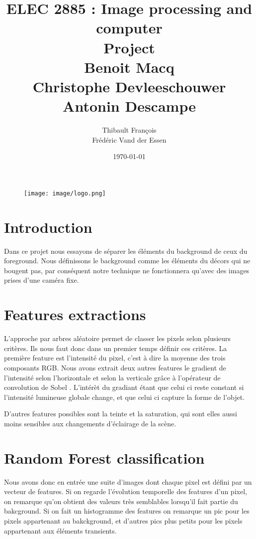 \documentclass[8pt,a4paper]{report}
\title{ELEC 2885 : Image processing and computer  \\ Project \\
Benoit Macq \\ Christophe Devleeschouwer \\ Antonin Descampe}
\author{Thibault François \\ Frédéric Vand der Essen}
\date{\today}
\begin{document}
	\begin{titlepage}		
		\begin{figure}[tbp]
			\begin{center}
				\texttt{[image: image/logo.png]}
			\end{center}
		\end{figure}
		\maketitle
	\end{titlepage}

\begin{multicols}{2}
\section{Introduction}
Dans ce projet nous essayons de séparer les éléments du background de ceux du foreground. Nous définissons le background comme les éléments du décors
qui ne bougent pas, par conséquent notre technique ne fonctionnera qu'avec des images prises d'une caméra fixe. 

\section{Features extractions}
	L'approche par arbres aléatoire permet de classer les pixels selon plusieurs critères. Ils nous faut donc dans un premier temps définir ces critères. 
	La première feature est l'intensité du pixel, c'est à dire la moyenne des trois composants RGB. 
	Nous avons extrait deux autres features le gradient de l'intensité selon l'horizontale et selon la verticale \cite{gradient} 
	grâce à l'opérateur de convolution de Sobel \cite{sobel}. L'intérèt du gradiant étant que celui ci reste constant si l'intensité lumineuse globale change,
	et que celui ci capture la forme de l'objet. 

	D'autres features possibles sont la teinte et la saturation, qui sont elles aussi moins sensibles aux changements d'éclairage de la scène. \cite{hsv} 

\section{Random Forest classification}

	Nous avons donc en entrée une suite d'images dont chaque pixel est défini par un vecteur de features.
	Si on regarde l'évolution temporelle des features d'un pixel, on remarque qu'on obtient des valeurs très
	semblables lorsqu'il fait partie du bakcground. Si on fait un histogramme des features on remarque un pic
	pour les pixels appartenant au bakckground, et d'autres pics plus petits pour les pixels appartenant aux
	éléments transients. 


\end{multicols}
\end{document}

